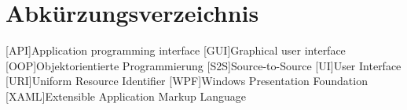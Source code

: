 \chapter{Abkürzungsverzeichnis}
\begin{acronym}[XAML]
[API]{Application programming interface}
[GUI]{Graphical user interface}
[OOP]{Objektorientierte Programmierung}
[S2S]{Source-to-Source}
[UI]{User Interface}
[URI]{Uniform Resource Identifier}
[WPF]{Windows Presentation Foundation}
[XAML]{Extensible Application Markup Language}

\end{acronym}